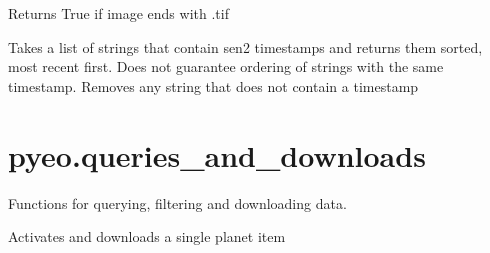 \documentclass[letterpaper,10pt,english]{sphinxmanual}
\begin{document}

\begin{fulllineitems}
\label{\detokenize{index:pyeo.filesystem_utilities.is_tif}}
Returns True if image ends with .tif

\end{fulllineitems}


\begin{fulllineitems}
\label{\detokenize{index:pyeo.filesystem_utilities.sort_by_timestamp}}
Takes a list of strings that contain sen2 timestamps and returns them sorted, most recent first. Does not
guarantee ordering of strings with the same timestamp. Removes any string that does not contain a timestamp

\end{fulllineitems}

\label{\detokenize{index:module-pyeo.queries_and_downloads}}

\section{pyeo.queries\_and\_downloads}
\label{\detokenize{index:pyeo-queries-and-downloads}}
Functions for querying, filtering and downloading data.

\begin{fulllineitems}
\label{\detokenize{index:pyeo.queries_and_downloads.activate_and_dl_planet_item}}
Activates and downloads a single planet item

\end{fulllineitems}
\end{document}
